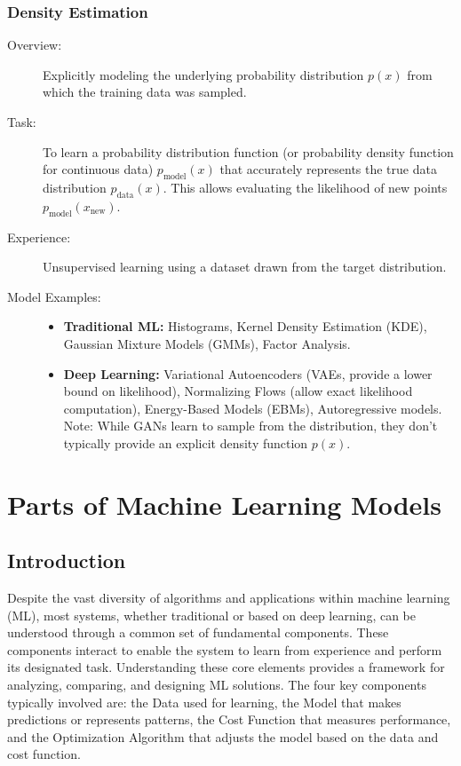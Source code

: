 \documentclass{article}
\begin{document}
\subsubsection{Density Estimation}
\begin{description}
    \item[Overview:] Explicitly modeling the underlying probability distribution $p(x)$ from which the training data was sampled.
    \item[Task:] To learn a probability distribution function (or probability density function for continuous data) $p_{\text{model}}(x)$ that accurately represents the true data distribution $p_{\text{data}}(x)$. This allows evaluating the likelihood of new points $p_{\text{model}}(x_{\text{new}})$.
    \item[Experience:] Unsupervised learning using a dataset drawn from the target distribution.
    \item[Model Examples:]
        \begin{itemize}
            \item \textbf{Traditional ML:} Histograms, Kernel Density Estimation (KDE), Gaussian Mixture Models (GMMs), Factor Analysis.
            \item \textbf{Deep Learning:} Variational Autoencoders (VAEs, provide a lower bound on likelihood), Normalizing Flows (allow exact likelihood computation), Energy-Based Models (EBMs), Autoregressive models. Note: While GANs learn to sample from the distribution, they don't typically provide an explicit density function $p(x)$.
        \end{itemize}
\end{description}


\section{Parts of Machine Learning Models}

\subsection{Introduction}

Despite the vast diversity of algorithms and applications within machine learning (ML), most systems, whether traditional or based on deep learning, can be understood through a common set of fundamental components. These components interact to enable the system to learn from experience and perform its designated task. Understanding these core elements provides a framework for analyzing, comparing, and designing ML solutions. The four key components typically involved are: the Data used for learning, the Model that makes predictions or represents patterns, the Cost Function that measures performance, and the Optimization Algorithm that adjusts the model based on the data and cost function.
\end{document}
